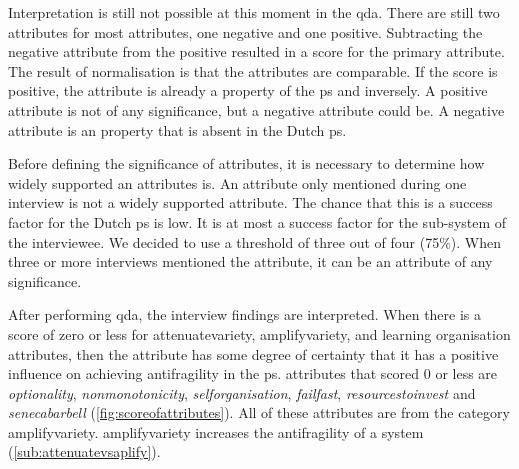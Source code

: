 Interpretation is still not possible at this moment in the \gls{qda}. There are still two \glspl{attribute} for most \glspl{attribute}, one negative and one positive. Subtracting the negative \gls{attribute} from the positive resulted in a score for the primary \gls{attribute}. The result of normalisation is that the \glspl{attribute} are comparable. If the score is positive, the \gls{attribute} is already a property of the \gls{ps} and inversely. A positive \gls{attribute} is not of any significance, but a negative \gls{attribute} could be. A negative attribute is an property that is absent in the Dutch \gls{ps}.
 
Before defining the significance of \glspl{attribute}, it is necessary to determine how widely supported an \glspl{attribute} is. An \gls{attribute} only mentioned during one interview is not a widely supported \gls{attribute}. The chance that this is a success factor for the Dutch \gls{ps} is low. It is at most a success factor for the sub-system of the interviewee. We decided to use a threshold of three out of four (75\%). When three or more interviews mentioned the attribute, it can be an attribute of any significance.

After performing \gls{qda}, the interview findings are interpreted. When there is a score of zero or less for \gls{attenuatevariety}, \gls{amplifyvariety}, and learning organisation \glspl{attribute}, then the \gls{attribute} has some degree of certainty that it has a positive influence on achieving \gls{antifragility} in the \gls{ps}. \Glspl{attribute} that scored 0 or less are \textit{\gls{optionality}}, \textit{\gls{nonmonotonicity}}, \textit{\gls{selforganisation}}, \textit{\gls{failfast}}, \textit{\gls{resourcestoinvest}} and \textit{\gls{senecabarbell}} (\cref{fig:scoreofattributes}). All of these \glspl{attribute} are from the category \gls{amplifyvariety}. \Gls{amplifyvariety} increases the \gls{antifragility} of a system (\cref{sub:attenuatevsaplify}).

